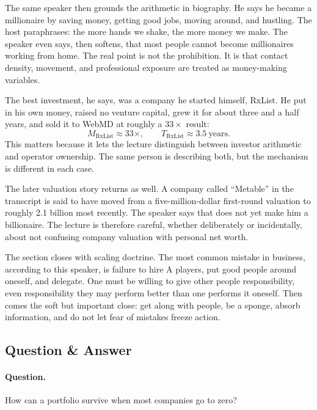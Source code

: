 The same speaker then grounds the arithmetic in biography. He says he became a millionaire by saving money, getting good jobs, moving around, and hustling. The host paraphrases: the more hands we shake, the more money we make. The speaker even says, then softens, that most people cannot become millionaires working from home. The real point is not the prohibition. It is that contact density, movement, and professional exposure are treated as money-making variables.

The best investment, he says, was a company he started himself, RxList. He put in his own money, raised no venture capital, grew it for about three and a half years, and sold it to WebMD at roughly a \(33\times\) result:
\begin{equation}
M_{\text{RxList}} \approx 33\times,\qquad
T_{\text{RxList}} \approx 3.5\ \text{years}.
\end{equation}
This matters because it lets the lecture distinguish between investor arithmetic and operator ownership. The same person is describing both, but the mechanism is different in each case.

The later valuation story returns as well. A company called ``Metable'' in the transcript is said to have moved from a five-million-dollar first-round valuation to roughly 2.1 billion most recently. The speaker says that does not yet make him a billionaire. The lecture is therefore careful, whether deliberately or incidentally, about not confusing company valuation with personal net worth.

The section closes with scaling doctrine. The most common mistake in business, according to this speaker, is failure to hire A players, put good people around oneself, and delegate. One must be willing to give other people responsibility, even responsibility they may perform better than one performs it oneself. Then comes the soft but important close: get along with people, be a sponge, absorb information, and do not let fear of mistakes freeze action.

\subsection{Question \& Answer}

\paragraph{Question.} How can a portfolio survive when most companies go to zero?


